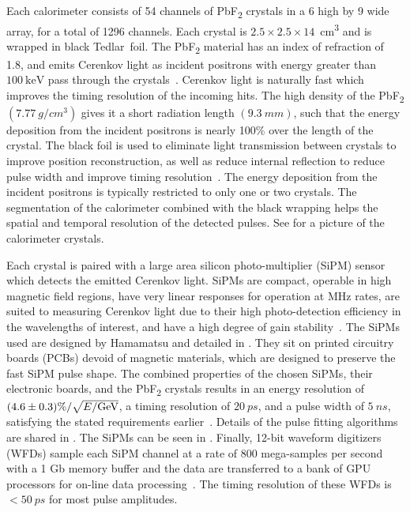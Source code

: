 Each calorimeter consists of 54 channels of PbF\textsubscript{2} crystals in a 6 high by 9 wide array, for a total of 1296 channels. Each crystal is $2.5 \times 2.5 \times 14$~cm\textsuperscript{3} and is wrapped in black Tedlar\textregistered\ foil. The PbF\textsubscript{2} material has an index of refraction of 1.8, and emits Cerenkov light as incident positrons with energy greater than $\SI{100}{\keV}$ pass through the crystals~\cite{Fienberg:2014kka}. Cerenkov light is naturally fast which improves the timing resolution of the incoming hits. The high density of the PbF\textsubscript{2} $(\SI{7.77}{g/cm^{3}})$ gives it a short radiation length $(\SI{9.3}{mm})$, such that the energy deposition from the incident positrons is nearly 100\% over the length of the crystal. The black foil is used to eliminate light transmission between crystals to improve position reconstruction, as well as reduce internal reflection to reduce pulse width and improve timing resolution~\cite{Kaspar:2016ofv}. The energy deposition from the incident positrons is typically restricted to only one or two crystals. The segmentation of the calorimeter combined with the black wrapping helps the spatial and temporal resolution of the detected pulses. See  for a picture of the calorimeter crystals.



Each crystal is paired with a large area silicon photo-multiplier (SiPM) sensor which detects the emitted Cerenkov light. SiPMs are compact, operable in high magnetic field regions, have very linear responses for operation at MHz rates, are suited to measuring Cerenkov light due to their high photo-detection efficiency in the wavelengths of interest, and have a high degree of gain stability~\cite{Kaspar:2016ofv}. The SiPMs used are designed by Hamamatsu and detailed in . They sit on printed circuitry boards (PCBs) devoid of magnetic materials, which are designed to preserve the fast SiPM pulse shape. The combined properties of the chosen SiPMs, their electronic boards, and the PbF\textsubscript{2} crystals results in an energy resolution of $(4.6 \pm 0.3) \% / \sqrt{E/\text{G\text{e\kern-0.15ex V}}}$, a timing resolution of $\SI{20}{ps}$, and a pulse width of $\SI{5}{ns}$, satisfying the stated requirements earlier~\cite{Fienberg:2014kka,Kaspar:2016ofv}. Details of the pulse fitting algorithms are shared in . The SiPMs can be seen in . Finally, 12-bit waveform digitizers (WFDs) sample each SiPM channel at a rate of 800 mega-samples per second with a 1 Gb memory buffer and the data are transferred to a bank of GPU processors for on-line data processing~\cite{Sweigart:2016jty}. The timing resolution of these WFDs is $<\SI{50}{ps}$ for most pulse amplitudes. 

